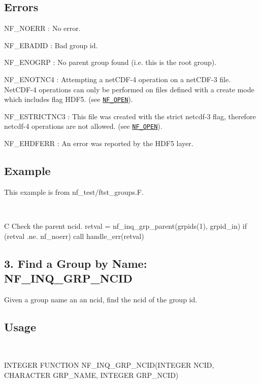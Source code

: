 \subsection*{Errors }

{\ttfamily N\+F\+\_\+\+N\+O\+E\+RR} \+: No error.

{\ttfamily N\+F\+\_\+\+E\+B\+A\+D\+ID} \+: Bad group id.

{\ttfamily N\+F\+\_\+\+E\+N\+O\+G\+RP} \+: No parent group found (i.\+e. this is the root group).

{\ttfamily N\+F\+\_\+\+E\+N\+O\+T\+N\+C4} \+: Attempting a net\+C\+D\+F-\/4 operation on a net\+C\+D\+F-\/3 file. Net\+C\+D\+F-\/4 operations can only be performed on files defined with a create mode which includes flag H\+D\+F5. (see \href{#NF_005fOPEN}{\tt N\+F\+\_\+\+O\+P\+EN}).

{\ttfamily N\+F\+\_\+\+E\+S\+T\+R\+I\+C\+T\+N\+C3} \+: This file was created with the strict netcdf-\/3 flag, therefore netcdf-\/4 operations are not allowed. (see \href{#NF_005fOPEN}{\tt N\+F\+\_\+\+O\+P\+EN}).

{\ttfamily N\+F\+\_\+\+E\+H\+D\+F\+E\+RR} \+: An error was reported by the H\+D\+F5 layer.

\subsection*{Example }

This example is from nf\+\_\+test/ftst\+\_\+groups.\+F.

 

C Check the parent ncid. retval = nf\+\_\+inq\+\_\+grp\+\_\+parent(grpids(1), grpid\+\_\+in) if (retval .ne. nf\+\_\+noerr) call handle\+\_\+err(retval)\hypertarget{nc_f77_interface_guide_f77_NF-INQ-GRP-NCID}{}\subsection{3. Find a Group by Name\+: N\+F\+\_\+\+I\+N\+Q\+\_\+\+G\+R\+P\+\_\+\+N\+C\+I\+D }\label{nc_f77_interface_guide_f77_NF-INQ-GRP-NCID}
Given a group name an an ncid, find the ncid of the group id.

\subsection*{Usage }

 

I\+N\+T\+E\+G\+ER F\+U\+N\+C\+T\+I\+ON N\+F\+\_\+\+I\+N\+Q\+\_\+\+G\+R\+P\+\_\+\+N\+C\+I\+D(\+I\+N\+T\+E\+G\+E\+R N\+C\+I\+D, C\+H\+A\+R\+A\+C\+T\+E\+R G\+R\+P\+\_\+\+N\+A\+M\+E, I\+N\+T\+E\+G\+E\+R G\+R\+P\+\_\+\+N\+C\+I\+D)

